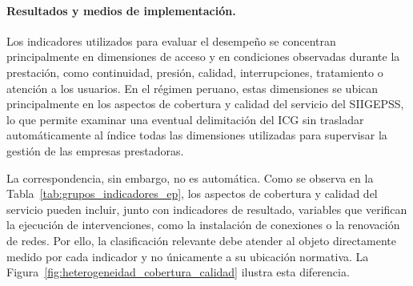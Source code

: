 \paragraph{Resultados y medios de implementación.}

Los indicadores utilizados para evaluar el desempeño se concentran principalmente en dimensiones de acceso y en condiciones observadas durante la prestación, como continuidad, presión, calidad, interrupciones, tratamiento o atención a los usuarios. En el régimen peruano, estas dimensiones se ubican principalmente en los aspectos de cobertura y calidad del servicio del SIIGEPSS, lo que permite examinar una eventual delimitación del ICG sin trasladar automáticamente al índice todas las dimensiones utilizadas para supervisar la gestión de las empresas prestadoras.

La correspondencia, sin embargo, no es automática. Como se observa en la Tabla~\ref{tab:grupos_indicadores_ep}, los aspectos de cobertura y calidad del servicio pueden incluir, junto con indicadores de resultado, variables que verifican la ejecución de intervenciones, como la instalación de conexiones o la renovación de redes. Por ello, la clasificación relevante debe atender al objeto directamente medido por cada indicador y no únicamente a su ubicación normativa. La Figura~\ref{fig:heterogeneidad_cobertura_calidad} ilustra esta diferencia.

